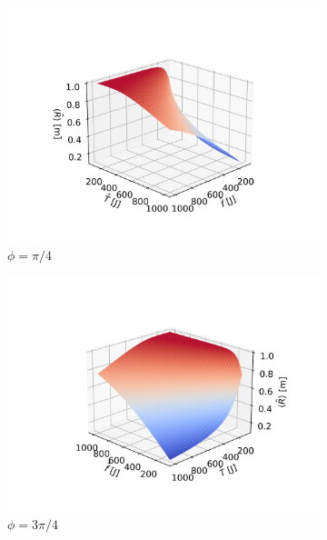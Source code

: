 \documentclass[12pt,twosides,onecolumn,openany]{article}
\begin{document}
\begin{figure}[h]
    \centering
    \begin{subfigure}[b]{0.48\textwidth}
         \includegraphics[width=\textwidth]{../../Lliurament_2/document_L2/plots/canvi_3D_45.png}
         \caption*{$\phi= \pi/4$}
         \label{fig:45}
    \end{subfigure}
    \hspace{0.3cm}
    \begin{subfigure}[b]{0.48\textwidth}
        \includegraphics[width=\textwidth]{../../Lliurament_2/document_L2/plots/canvi_3D_135.png}
        \caption*{$\phi= 3\pi/4$}
        \label{fig:135}
    \end{subfigure}
    \begin{subfigure}[b]{0.48\textwidth}

\end{subfigure}
\end{figure}
\end{document}

